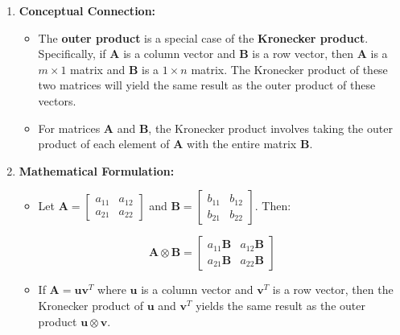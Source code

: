 \documentclass[
  letterpaper,
  DIV=11,
  numbers=noendperiod]{scrreprt}
\providecommand{\tightlist}{%
  \setlength{\itemsep}{0pt}\setlength{\parskip}{0pt}}\usepackage{longtable,booktabs,array}
\theoremstyle{plain}
\theoremstyle{definition}
\theoremstyle{remark}
\begin{document}
\begin{enumerate}
\def\labelenumi{\arabic{enumi}.}
\item
  \textbf{Conceptual Connection:}

  \begin{itemize}
  \item
    The \textbf{outer product} is a special case of the
    \textbf{Kronecker product}. Specifically, if \(\mathbf{A}\) is a
    column vector and \(\mathbf{B}\) is a row vector, then
    \(\mathbf{A}\) is a \(m \times 1\) matrix and \(\mathbf{B}\) is a
    \(1 \times n\) matrix. The Kronecker product of these two matrices
    will yield the same result as the outer product of these vectors.
  \item
    For matrices \(\mathbf{A}\) and \(\mathbf{B}\), the Kronecker
    product involves taking the outer product of each element of
    \(\mathbf{A}\) with the entire matrix \(\mathbf{B}\).
  \end{itemize}
\item
  \textbf{Mathematical Formulation:}

  \begin{itemize}
  \tightlist
  \item
    Let
    \(\mathbf{A} = \begin{bmatrix}a_{11} & a_{12}\\ a_{21} & a_{22}\end{bmatrix}\)
    and
    \(\mathbf{B} = \begin{bmatrix}b_{11} & b_{12}\\ b_{21} & b_{22}\end{bmatrix}\).
    Then:
  \end{itemize}

  \[\mathbf{A} \otimes \mathbf{B} = \begin{bmatrix} a_{11} \mathbf{B} & a_{12} \mathbf{B} \\ a_{21} \mathbf{B} & a_{22} \mathbf{B} \end{bmatrix}\]

  \begin{itemize}
  \tightlist
  \item
    If \(\mathbf{A} = \mathbf{u} \mathbf{v}^T\) where \(\mathbf{u}\) is
    a column vector and \(\mathbf{v}^T\) is a row vector, then the
    Kronecker product of \(\mathbf{u}\) and \(\mathbf{v}^T\) yields the
    same result as the outer product \(\mathbf{u} \otimes \mathbf{v}\).
  \end{itemize}
\end{enumerate}
\end{document}
